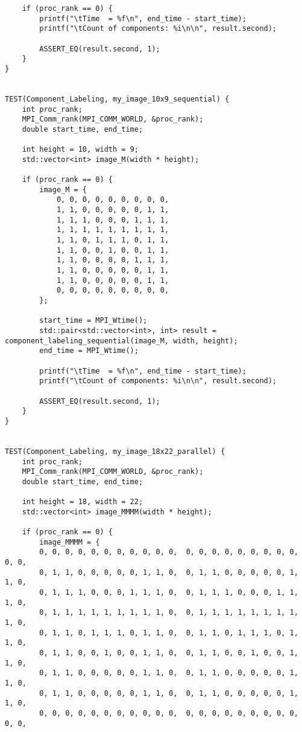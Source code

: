 \documentclass{report}
\begin{document}
\begin{lstlisting}
    if (proc_rank == 0) {
        printf("\tTime  = %f\n", end_time - start_time);
        printf("\tCount of components: %i\n\n", result.second);

        ASSERT_EQ(result.second, 1);
    }
}


TEST(Component_Labeling, my_image_10x9_sequential) {
    int proc_rank;
    MPI_Comm_rank(MPI_COMM_WORLD, &proc_rank);
    double start_time, end_time;

    int height = 10, width = 9;
    std::vector<int> image_M(width * height);

    if (proc_rank == 0) {
        image_M = {
            0, 0, 0, 0, 0, 0, 0, 0, 0,
            1, 1, 0, 0, 0, 0, 0, 1, 1,
            1, 1, 1, 0, 0, 0, 1, 1, 1,
            1, 1, 1, 1, 1, 1, 1, 1, 1,
            1, 1, 0, 1, 1, 1, 0, 1, 1,
            1, 1, 0, 0, 1, 0, 0, 1, 1,
            1, 1, 0, 0, 0, 0, 1, 1, 1,
            1, 1, 0, 0, 0, 0, 0, 1, 1,
            1, 1, 0, 0, 0, 0, 0, 1, 1,
            0, 0, 0, 0, 0, 0, 0, 0, 0,
        };

        start_time = MPI_Wtime();
        std::pair<std::vector<int>, int> result = component_labeling_sequential(image_M, width, height);
        end_time = MPI_Wtime();

        printf("\tTime  = %f\n", end_time - start_time);
        printf("\tCount of components: %i\n\n", result.second);

        ASSERT_EQ(result.second, 1);
    }
}


TEST(Component_Labeling, my_image_18x22_parallel) {
    int proc_rank;
    MPI_Comm_rank(MPI_COMM_WORLD, &proc_rank);
    double start_time, end_time;

    int height = 18, width = 22;
    std::vector<int> image_MMMM(width * height);

    if (proc_rank == 0) {
        image_MMMM = {
        0, 0, 0, 0, 0, 0, 0, 0, 0, 0, 0,  0, 0, 0, 0, 0, 0, 0, 0, 0, 0, 0,
        0, 1, 1, 0, 0, 0, 0, 0, 1, 1, 0,  0, 1, 1, 0, 0, 0, 0, 0, 1, 1, 0,
        0, 1, 1, 1, 0, 0, 0, 1, 1, 1, 0,  0, 1, 1, 1, 0, 0, 0, 1, 1, 1, 0,
        0, 1, 1, 1, 1, 1, 1, 1, 1, 1, 0,  0, 1, 1, 1, 1, 1, 1, 1, 1, 1, 0,
        0, 1, 1, 0, 1, 1, 1, 0, 1, 1, 0,  0, 1, 1, 0, 1, 1, 1, 0, 1, 1, 0,
        0, 1, 1, 0, 0, 1, 0, 0, 1, 1, 0,  0, 1, 1, 0, 0, 1, 0, 0, 1, 1, 0,
        0, 1, 1, 0, 0, 0, 0, 0, 1, 1, 0,  0, 1, 1, 0, 0, 0, 0, 0, 1, 1, 0,
        0, 1, 1, 0, 0, 0, 0, 0, 1, 1, 0,  0, 1, 1, 0, 0, 0, 0, 0, 1, 1, 0,
        0, 0, 0, 0, 0, 0, 0, 0, 0, 0, 0,  0, 0, 0, 0, 0, 0, 0, 0, 0, 0, 0,


\end{lstlisting}
\end{document}
